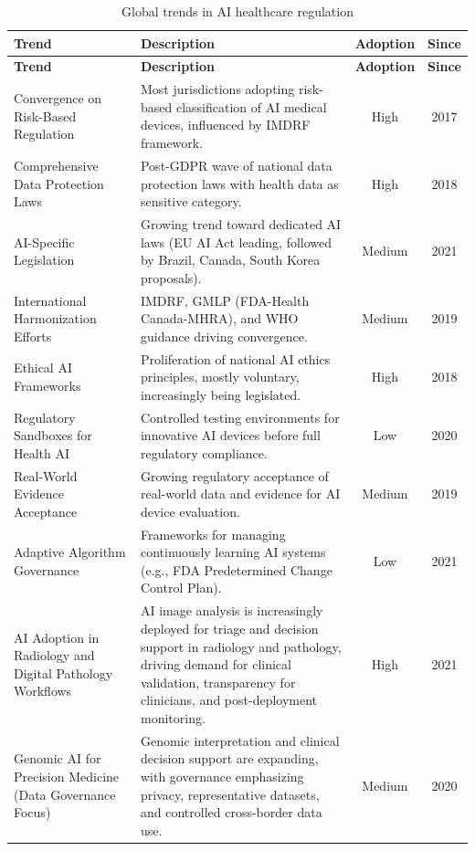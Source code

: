 \begin{longtable}{@{}p{4.2cm} p{7.8cm} c c@{}}
\caption{Global trends in AI healthcare regulation} \label{tab:global-trends} \\
\toprule
\textbf{Trend} & \textbf{Description} & \textbf{Adoption} & \textbf{Since} \\
\midrule
\endfirsthead
\toprule
\textbf{Trend} & \textbf{Description} & \textbf{Adoption} & \textbf{Since} \\
\midrule
\endhead
\bottomrule
\endfoot
Convergence on Risk-Based Regulation & Most jurisdictions adopting risk-based classification of AI medical devices, influenced by IMDRF framework. & High & 2017 \\
Comprehensive Data Protection Laws & Post-GDPR wave of national data protection laws with health data as sensitive category. & High & 2018 \\
AI-Specific Legislation & Growing trend toward dedicated AI laws (EU AI Act leading, followed by Brazil, Canada, South Korea proposals). & Medium & 2021 \\
International Harmonization Efforts & IMDRF, GMLP (FDA-Health Canada-MHRA), and WHO guidance driving convergence. & Medium & 2019 \\
Ethical AI Frameworks & Proliferation of national AI ethics principles, mostly voluntary, increasingly being legislated. & High & 2018 \\
Regulatory Sandboxes for Health AI & Controlled testing environments for innovative AI devices before full regulatory compliance. & Low & 2020 \\
Real-World Evidence Acceptance & Growing regulatory acceptance of real-world data and evidence for AI device evaluation. & Medium & 2019 \\
Adaptive Algorithm Governance & Frameworks for managing continuously learning AI systems (e.g., FDA Predetermined Change Control Plan). & Low & 2021 \\
AI Adoption in Radiology and Digital Pathology Workflows & AI image analysis is increasingly deployed for triage and decision support in radiology and pathology, driving demand for clinical validation, transparency for clinicians, and post-deployment monitoring. & High & 2021 \\
Genomic AI for Precision Medicine (Data Governance Focus) & Genomic interpretation and clinical decision support are expanding, with governance emphasizing privacy, representative datasets, and controlled cross-border data use. & Medium & 2020 \\

\end{longtable}
